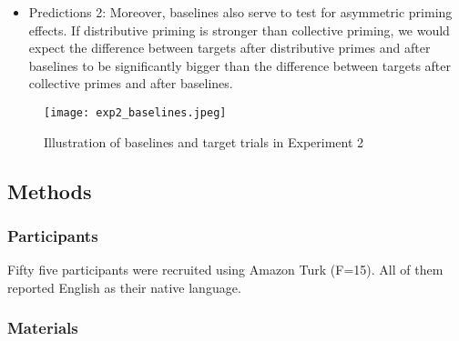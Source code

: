 \documentclass[a4paper]{article}
\begin{document}
\begin{itemize}
\item Predictions 2: Moreover, baselines also serve to test for asymmetric priming effects. If distributive priming is stronger than collective priming, we would expect the difference between targets after distributive primes and after baselines to be significantly bigger than the difference between targets after collective primes and after baselines.  


\end{itemize}



\begin{figure}[h!]
  \centering
    \texttt{[image: exp2\_baselines.jpeg]}
      \caption{Illustration of baselines and target trials in Experiment 2}
      \label{fig.examples.item.baselines}
\end{figure}





\subsection{Methods}

\subsubsection{Participants}
Fifty five participants were recruited using Amazon Turk (F=15). All of them reported English as their native language. 

\subsubsection{Materials}
\end{document}
